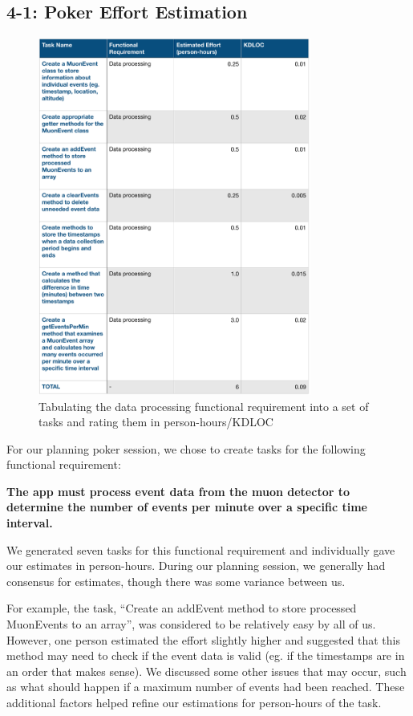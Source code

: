\documentclass[11pt,a4paper]{article}
\begin{document}
\subsection*{4-1: Poker Effort Estimation}

\begin{figure}[h]
  \centering
      \includegraphics[width=0.8\textwidth]{dataproctable2.png}  
      \caption{Tabulating the data processing functional requirement into a set of tasks and rating them in person-hours/KDLOC}
\end{figure}

\newpage

For our planning poker session, we chose to create tasks for the following functional requirement:

\textbf{The app must process event data from the muon detector to determine the number of events per minute over a specific time interval.}

We generated seven tasks for this functional requirement and individually gave our estimates in person-hours. During our planning session, we generally had consensus for estimates, though there was some variance between us. 

For example, the task, “Create an addEvent method to store processed MuonEvents to an array”, was considered to be relatively easy by all of us. However, one person estimated the effort slightly higher and suggested that this method may need to check if the event data is valid (eg. if the timestamps are in an order that makes sense). We discussed some other issues that may occur, such as what should happen if a maximum number of events had been reached. These additional factors helped refine our estimations for person-hours of the task.
\end{document}
